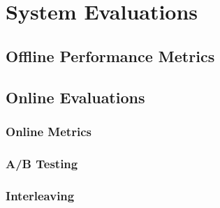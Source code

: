 %
%
%
\chapter{System Evaluations}


\section{Offline Performance Metrics}
\section{Online Evaluations}
\subsection{Online Metrics}
\subsection{A/B Testing}
\subsection{Interleaving}



